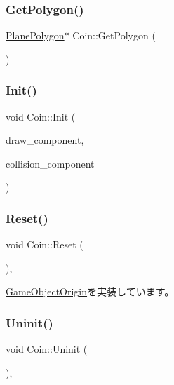 \subsubsection{\texorpdfstring{Get\+Polygon()}{GetPolygon()}}
{\footnotesize\ttfamily \mbox{\hyperlink{class_plane_polygon}{Plane\+Polygon}}$\ast$ Coin\+::\+Get\+Polygon (\begin{DoxyParamCaption}{ }\end{DoxyParamCaption})\hspace{0.3cm}{\ttfamily [inline]}}

\mbox{\label{class_coin_a434dff8fe630ca5155ef54d9dd5fac8b}} 
\subsubsection{\texorpdfstring{Init()}{Init()}}
{\footnotesize\ttfamily void Coin\+::\+Init (\begin{DoxyParamCaption}\item[{\mbox{\hyperlink{class_draw_component}{Draw\+Component}} $\ast$}]{draw\+\_\+component,  }\item[{\mbox{\hyperlink{class_collision_component}{Collision\+Component}} $\ast$}]{collision\+\_\+component }\end{DoxyParamCaption})}

\mbox{\label{class_coin_a52c50229ce7c1e0f459e198adac70c8d}} 
\subsubsection{\texorpdfstring{Reset()}{Reset()}}
{\footnotesize\ttfamily void Coin\+::\+Reset (\begin{DoxyParamCaption}{ }\end{DoxyParamCaption})\hspace{0.3cm}{\ttfamily [override]}, {\ttfamily [virtual]}}



\mbox{\hyperlink{class_game_object_origin_af9af378a4fd9028316a6fdb461ed6a10}{Game\+Object\+Origin}}を実装しています。

\mbox{\label{class_coin_a4d364dcb4b57b80ea00ce931d0bb300f}} 
\subsubsection{\texorpdfstring{Uninit()}{Uninit()}}
{\footnotesize\ttfamily void Coin\+::\+Uninit (\begin{DoxyParamCaption}{ }\end{DoxyParamCaption})\hspace{0.3cm}{\ttfamily [override]}, {\ttfamily [virtual]}}



